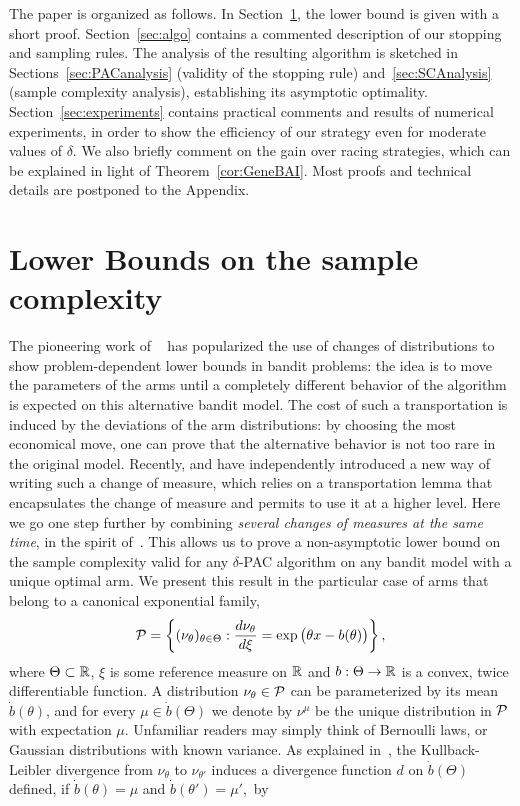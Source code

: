 \documentclass{colt2016} %
\begin{document}
The paper is organized as follows. 
In Section~\ref{sec:lb}, the lower bound is given with a short proof.
Section~\ref{sec:algo} contains a commented description of our stopping and sampling rules.
The analysis of the resulting algorithm is sketched in Sections~\ref{sec:PACanalysis} (validity of the stopping rule) and~\ref{sec:SCAnalysis} (sample complexity analysis), establishing its asymptotic optimality.
Section~\ref{sec:experiments} contains practical comments and results of numerical experiments, in order to show the  efficiency of our strategy even for moderate values of $\delta$. We also briefly comment on the gain over racing strategies, which can be explained in light of Theorem~\ref{cor:GeneBAI}. Most proofs and technical details are postponed to the Appendix.

\section{Lower Bounds on the sample complexity}\label{sec:lb}
The pioneering work of ~\cite{LaiRobbins85bandits} has popularized the use of changes of distributions to show problem-dependent lower bounds in bandit problems: the idea is to move the parameters of the arms until a completely different behavior of the algorithm is expected on this alternative bandit model. The cost of such a transportation is induced by the deviations of the arm distributions: by choosing the most economical move, one can prove that the alternative behavior is not too rare in the original model. Recently, \cite{COLT14} and \cite{Combes14Unimodal} have independently introduced a new way of writing such a change of measure, which relies on a transportation lemma that encapsulates the change of measure and permits to use it at a higher level. 
Here we go one step further by combining \emph{several changes of measures at the same time}, in the spirit of~\cite{GravesLai97}. This allows us to prove a non-asymptotic lower bound on the sample complexity valid for any $\delta$-PAC algorithm on any bandit model with a unique optimal arm. We present this result in the particular case of arms that belong to a canonical exponential family,
\[\mathcal{P} = \left\{(\nu_\theta)_{\theta \in \Theta} : \frac{d\nu_\theta}{d\xi} = \exp\big(\theta x - b(\theta)\big)  \right\},\]
where ${\Theta}\subset{\mathbb{R}}$, $\xi$ is some reference measure on $\mathbb{R}$ and $b : \Theta \rightarrow \mathbb{R}$ is a convex, twice differentiable function. A distribution $\nu_\theta\in\mathcal{P}$ can be parameterized by its mean $\dot{b}(\theta)$, and for every $\mu \in \dot{b}(\Theta)$ we denote by $\nu^\mu$ be the unique distribution in $\mathcal{P}$ with expectation $\mu$. Unfamiliar readers may simply think of Bernoulli laws, or Gaussian distributions with known variance. As explained in~\citet[see also references therein]{KLUCBJournal}, the Kullback-Leibler divergence from $\nu_\theta$ to $\nu_{\theta'}$ induces a divergence function $d$ on $\dot{b}(\Theta)$ defined, if $\dot{b}(\theta)=\mu$ and $\dot{b}(\theta')=\mu'$,~by
\end{document}
